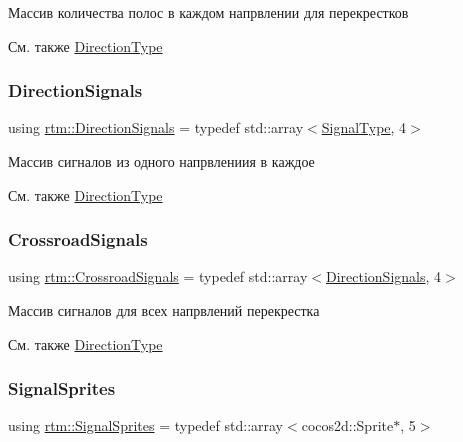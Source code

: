 Массив количества полос в каждом напрвлении для перекрестков \begin{DoxySeeAlso}{См. также}
\hyperlink{namespacertm_a57b216f3aeb45041f3461bab08bc3aeb}{Direction\+Type} 
\end{DoxySeeAlso}
\mbox{\label{namespacertm_a681634e130c2137fe63a658b0e0a5e46}} 
\subsubsection{\texorpdfstring{Direction\+Signals}{DirectionSignals}}
{\footnotesize\ttfamily using \hyperlink{namespacertm_a681634e130c2137fe63a658b0e0a5e46}{rtm\+::\+Direction\+Signals} = typedef std\+::array$<$\hyperlink{namespacertm_aadb7300c15d57429546fb0b7f8ee0ee6}{Signal\+Type}, 4$>$}

Массив сигналов из одного напрвлениия в каждое \begin{DoxySeeAlso}{См. также}
\hyperlink{namespacertm_a57b216f3aeb45041f3461bab08bc3aeb}{Direction\+Type} 
\end{DoxySeeAlso}
\mbox{\label{namespacertm_afa6df86cef8e2ebcc053ad994e440354}} 
\subsubsection{\texorpdfstring{Crossroad\+Signals}{CrossroadSignals}}
{\footnotesize\ttfamily using \hyperlink{namespacertm_afa6df86cef8e2ebcc053ad994e440354}{rtm\+::\+Crossroad\+Signals} = typedef std\+::array$<$\hyperlink{namespacertm_a681634e130c2137fe63a658b0e0a5e46}{Direction\+Signals}, 4$>$}

Массив сигналов для всех напрвлений перекрестка \begin{DoxySeeAlso}{См. также}
\hyperlink{namespacertm_a57b216f3aeb45041f3461bab08bc3aeb}{Direction\+Type} 
\end{DoxySeeAlso}
\mbox{\label{namespacertm_ab6c6acbd1378bfe5755d77179a7131ff}} 
\subsubsection{\texorpdfstring{Signal\+Sprites}{SignalSprites}}
{\footnotesize\ttfamily using \hyperlink{namespacertm_ab6c6acbd1378bfe5755d77179a7131ff}{rtm\+::\+Signal\+Sprites} = typedef std\+::array$<$cocos2d\+::\+Sprite$\ast$, 5$>$}

